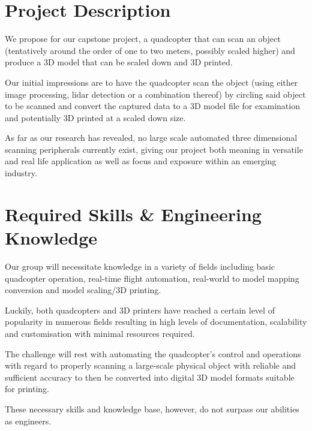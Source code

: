 \documentclass[10pt,letterpaper]{article}
\begin{document}
\section*{Project Description}
We propose for our capstone project, a quadcopter that can scan an object (tentatively around the order of one to two meters, possibly scaled higher) and produce a 3D model that can be scaled down and 3D printed. \par 
Our initial impressions are to have the quadcopter scan the object (using either image processing, lidar detection or a combination thereof) by circling said object to be scanned and convert the captured data to a 3D model file for examination and potentially 3D printed at a scaled down size. \par 
As far as our research has revealed, no large scale automated three dimensional scanning peripherals currently exist, giving our project both meaning in versatile and real life application as well as focus and exposure within an emerging industry.

\section*{Required Skills \& Engineering Knowledge}
Our group will necessitate knowledge in a variety of fields including basic quadcopter operation, real-time flight automation, real-world to model mapping conversion and model scaling/3D printing. \par 
Luckily, both quadcopters and 3D printers have reached a certain level of popularity in numerous fields resulting in high levels of documentation, scalability and customisation with minimal resources required. \par 
The challenge will rest with automating the quadcopter's control and operations with regard to properly scanning a large-scale physical object with reliable and sufficient accuracy to then be converted into digital 3D model formats suitable for printing. \par 
These necessary skills and knowledge base, however, do not surpass our abilities as engineers.
\end{document}
